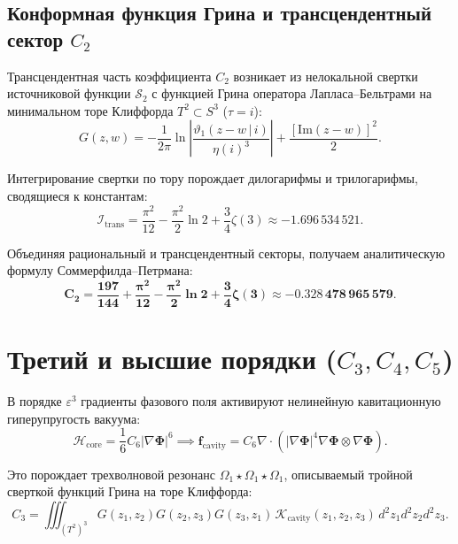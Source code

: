 \documentclass[12pt,a4paper]{article}
\begin{document}
	\subsection{Конформная функция Грина и трансцендентный сектор $C_2$}
	Трансцендентная часть коэффициента $C_2$ возникает из нелокальной свертки источниковой функции $\mathcal{S}_2$ с функцией Грина оператора Лапласа--Бельтрами на минимальном торе Клиффорда $T^2 \subset S^3$ ($\tau = i$):
	\begin{equation}
		G(z, w) = -\frac{1}{2\pi} \ln \left| \frac{\vartheta_1(z - w \,|\, i)}{\eta(i)^3} \right| + \frac{[\mathrm{Im}(z - w)]^2}{2}.
	\end{equation}
	
	Интегрирование свертки по тору порождает дилогарифмы и трилогарифмы, сводящиеся к константам:
	\begin{equation}
		\mathcal{I}_{\text{trans}} = \frac{\pi^2}{12} - \frac{\pi^2}{2}\ln 2 + \frac{3}{4}\zeta(3) \approx -1.696\,534\,521.
	\end{equation}
	
	Объединяя рациональный и трансцендентный секторы, получаем аналитическую формулу Соммерфилда--Петрмана:
	\begin{equation}
		\mathbf{C_2 = \frac{197}{144} + \frac{\pi^2}{12} - \frac{\pi^2}{2}\ln 2 + \frac{3}{4}\zeta(3) \approx -0.328\,478\,965\,579}.
	\end{equation}
	
	\section{Третий и высшие порядки ($C_3, C_4, C_5$)}
	
	В порядке $\varepsilon^3$ градиенты фазового поля активируют нелинейную кавитационную гиперупругость вакуума:
	\begin{equation}
		\mathcal{H}_{\text{core}} = \frac{1}{6} C_6 |\nabla \boldsymbol{\Phi}|^6 \implies \mathbf{f}_{\text{cavity}} = C_6 \nabla \cdot \left( |\nabla \boldsymbol{\Phi}|^4 \nabla \boldsymbol{\Phi} \otimes \nabla \boldsymbol{\Phi} \right).
	\end{equation}
	
	Это порождает трехволновой резонанс $\Omega_1 \star \Omega_1 \star \Omega_1$, описываемый тройной сверткой функций Грина на торе Клиффорда:
	\begin{equation}
		C_3 = \iiint_{(T^2)^3} G(z_1, z_2) G(z_2, z_3) G(z_3, z_1) \, \mathcal{K}_{\text{cavity}}(z_1, z_2, z_3) \, d^2z_1 d^2z_2 d^2z_3.
	\end{equation}
	
\end{document}
